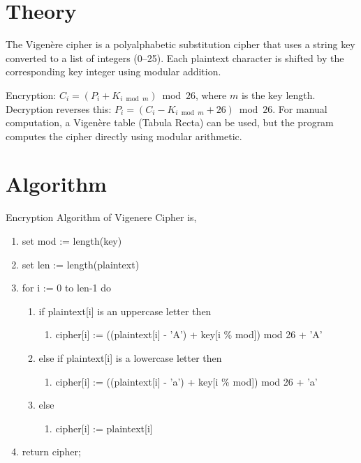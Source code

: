 
\section{Theory}
The Vigen\`ere cipher is a polyalphabetic substitution cipher that uses a string key converted to a list of integers (0--25). Each plaintext character is shifted by the corresponding key integer using modular addition.

Encryption: $C_i = (P_i + K_{i \bmod m}) \bmod 26$, where $m$ is the key length. Decryption reverses this: $P_i = (C_i - K_{i \bmod m} + 26) \bmod 26$. For manual computation, a Vigen\`ere table (Tabula Recta) can be used, but the program computes the cipher directly using modular arithmetic.

\section{Algorithm}
Encryption Algorithm of Vigenere Cipher is,
\begin{enumerate}
  \item set mod := length(key)
  \item set len := length(plaintext)
  \item for i := 0 to len-1 do
  \begin{enumerate}
    \item if plaintext[i] is an uppercase letter then
    \begin{enumerate}
      \item cipher[i] := ((plaintext[i] - 'A') + key[i \% mod]) mod 26 + 'A'
    \end{enumerate}
    \item else if plaintext[i] is a lowercase letter then
    \begin{enumerate}
      \item cipher[i] := ((plaintext[i] - 'a') + key[i \% mod]) mod 26 + 'a'
    \end{enumerate}
    \item else
    \begin{enumerate}
      \item cipher[i] := plaintext[i]
    \end{enumerate}
  \end{enumerate}
  \item return cipher;
\end{enumerate}

